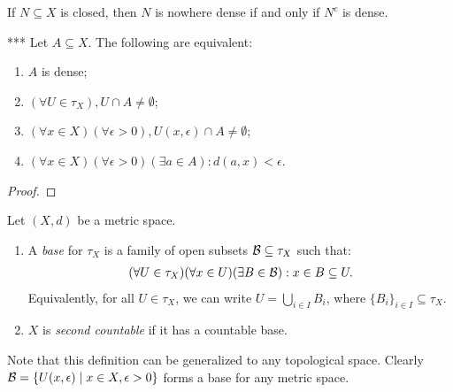     \begin{exercise}
        If $N \subseteq X$ is closed, then $N$ is nowhere dense if and only if $N^c$ is dense.
    \end{exercise}

    \begin{proposition}\label{prop:dense-properties}***
        Let $A \subseteq X$. The following are equivalent:
            \begin{enumerate}[label = (\arabic*),itemsep=1pt,topsep=3pt]
                \item $A$ is dense;
                \item $(\forall U \in \tau_X),U \cap A \neq \emptyset$;
                \item $(\forall x \in X)(\forall \epsilon>0), U(x,\epsilon) \cap A \neq \emptyset$;
                \item $(\forall x \in X)(\forall \epsilon>0)(\exists a \in A):d(a,x) < \epsilon$.
            \end{enumerate}
    \end{proposition}
        \begin{proof}
            
        \end{proof}

    \begin{definition}
        Let $(X,d)$ be a metric space. 
        \begin{enumerate}[label = (\arabic*),itemsep=1pt,topsep=3pt]
            \item A \textit{base} for $\tau_X$ is a family of open subsets $\mathcal{B} \subseteq \tau_X$ such that:
                \begin{equation*}
                \begin{split}
                    (\forall U \in \tau_X)(\forall x\in U)(\exists B \in \mathcal{B}):x \in B \subseteq U.
                \end{split}
                \end{equation*}
            Equivalently, for all $U \in \tau_X$, we can write $U = \bigcup_{i \in I}B_i$, where $\{B_i\}_{i \in I} \subseteq \tau_X$.

            \item $X$ is \textit{second countable} if it has a countable base.
        \end{enumerate}
    \end{definition}

    Note that this definition can be generalized to any topological space. Clearly $\mathcal{B} = \{U(x,\epsilon) \mid x \in X, \epsilon>0\}$ forms a base for any metric space.

